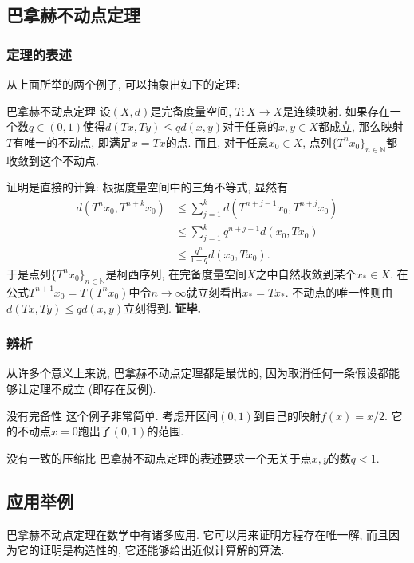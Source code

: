 \subsection{巴拿赫不动点定理}
\subsubsection{定理的表述}
从上面所举的两个例子, 可以抽象出如下的定理:
\begin{theorem}{巴拿赫不动点定理}
设$(X,d)$是完备度量空间, $T:X\to X$是连续映射. 如果存在一个数$q\in(0,1)$使得$d(Tx,Ty)\leq qd(x,y)$对于任意的$x,y\in X$都成立, 那么映射$T$有唯一的不动点, 即满足$x=Tx$的点. 而且, 对于任意$x_0\in X$, 点列$\{T^nx_0\}_{n\in\mathbb{N}}$都收敛到这个不动点.
\end{theorem}
证明是直接的计算: 根据度量空间中的三角不等式, 显然有
$$
\begin{aligned}
d(T^nx_0,T^{n+k}x_0)
&\leq \sum_{j=1}^k d(T^{n+j-1}x_0,T^{n+j}x_0)\\
&\leq \sum_{j=1}^k q^{n+j-1}d(x_0,Tx_0)\\
&\leq \frac{q^n}{1-q}d(x_0,Tx_0).
\end{aligned}
$$
于是点列$\{T^nx_0\}_{n\in\mathbb{N}}$是柯西序列, 在完备度量空间$X$之中自然收敛到某个$x_*\in X$. 在公式$T^{n+1}x_0=T(T^nx_0)$中令$n\to\infty$就立刻看出$x_*=Tx_*$. 不动点的唯一性则由$d(Tx,Ty)\leq qd(x,y)$立刻得到. \textbf{证毕.}

\subsubsection{辨析}
从许多个意义上来说, 巴拿赫不动点定理都是最优的, 因为取消任何一条假设都能够让定理不成立 (即存在反例).

\begin{example}{没有完备性}
这个例子非常简单. 考虑开区间$(0,1)$到自己的映射$f(x)=x/2$. 它的不动点$x=0$跑出了$(0,1)$的范围.
\end{example}

\begin{example}{没有一致的压缩比}
巴拿赫不动点定理的表述要求一个无关于点$x,y$的数$q<1$. 
\end{example}

\subsection{应用举例}
巴拿赫不动点定理在数学中有诸多应用. 它可以用来证明方程存在唯一解, 而且因为它的证明是构造性的, 它还能够给出近似计算解的算法.
